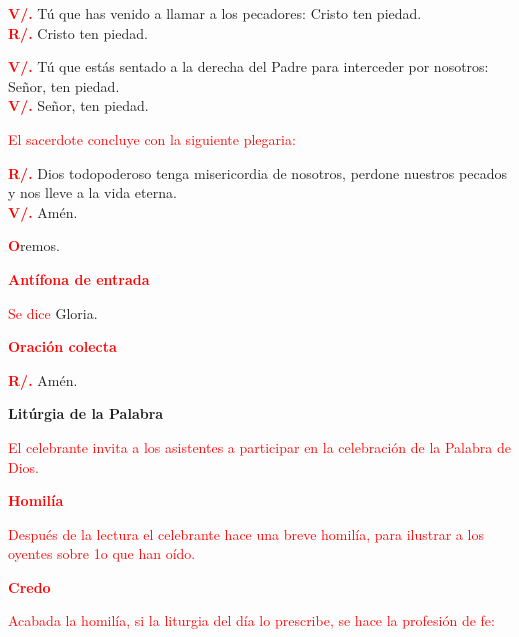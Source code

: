 \documentclass[12pt, letterpaper]{report}
\begin{document}
\noindent
\Large {\bfseries \textcolor{red}{V/.}} \hspace{1cm} T\'u que has venido a llamar a los pecadores: Cristo ten piedad.\\
\noindent
\Large {\bfseries \textcolor{red}{R/.}} \hspace{1cm} Cristo ten piedad.

\noindent
\Large {\bfseries \textcolor{red}{V/.}} \hspace{1cm} T\'u que est\'as sentado a la derecha del Padre para interceder por nosotros: Se\~nor, ten piedad.\\
\noindent
{\bfseries \textcolor{red}{V/.}} \hspace{1cm} Se\~nor, ten piedad. 

\large {\textcolor{red}{El sacerdote concluye con la siguiente plegaria:}}

\noindent
\Large {\bfseries \textcolor{red}{R/.}} \hspace{1cm} Dios todopoderoso tenga misericordia de nosotros, perdone nuestros pecados y nos lleve a la vida eterna.\\
\noindent
\Large {\bfseries \textcolor{red}{V/.}} \hspace{1cm} Am\'en.

\noindent
\lettrine[lines=1]{\bfseries \textcolor{red}{O}}{}\Large {remos.}

\Large {\bfseries \textcolor{red}{Ant\'ifona de entrada}}

\large {\textcolor{red}{Se dice} Gloria.}

\Large {\bfseries \textcolor{red}{Oraci\'on colecta}}

\noindent
\Large {\bfseries \textcolor{red}{R/.}} \hspace{1cm} Am\'en.

\newpage

\begin{center}
\Huge {\bfseries Lit\'urgia de la Palabra}
\end{center}

\large {\textcolor{red}{El celebrante invita a los asistentes a participar en la celebraci\'on de la Palabra de Dios.}} 

\Large {\bfseries \textcolor{red}{Homil\'ia}}

\large {\textcolor{red}{Despu\'es de la lectura el celebrante hace una breve homil\'ia, para ilustrar a los oyentes sobre 1o que han o\'ido.}}

\Large {\bfseries \textcolor{red}{Credo}}

\large {\textcolor{red}{Acabada la homil\'ia, si la liturgia del d\'ia lo prescribe, se hace la profesi\'on de fe:}}
\end{document}
